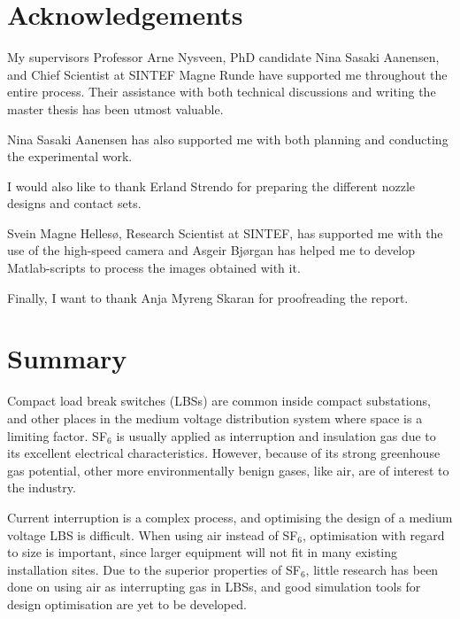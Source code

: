 \documentclass[10pt,b5paper,twoside]{article}
\begin{document}
\thispagestyle{empty}
\cleardoublepage
\section*{Acknowledgements}

My supervisors Professor Arne Nysveen, PhD candidate Nina Sasaki Aanensen, and Chief Scientist at SINTEF Magne Runde have supported me throughout the entire process. Their assistance with both technical discussions and writing the master thesis has been utmost valuable.

Nina Sasaki Aanensen has also supported me with both planning and conducting the experimental work.

I would also like to thank Erland Strendo for preparing the different nozzle designs and contact sets.

Svein Magne Hellesø, Research Scientist at SINTEF, has supported me with the use of the high-speed camera and Asgeir Bjørgan has helped me to develop Matlab-scripts to process the images obtained with it.

Finally, I want to thank Anja Myreng Skaran for proofreading the report.


\setcounter{page}{1}

\cleardoublepage
\section*{Summary}

Compact load break switches (LBSs) are common inside compact substations, and other places in the medium voltage distribution system where space is a limiting factor. SF$_6$ is usually applied as interruption and insulation gas due to its excellent electrical characteristics. However, because of its strong greenhouse gas potential, other more environmentally benign gases, like air, are of interest to the industry.

Current interruption is a complex process, and optimising the design of a medium voltage LBS is difficult. When using air instead of SF$_6$, optimisation with regard to size is important, since larger equipment will not fit in many existing installation sites. Due to the superior properties of SF$_6$, little research has been done on using air as interrupting gas in LBSs, and good simulation tools for design optimisation are yet to be developed.
\end{document}
